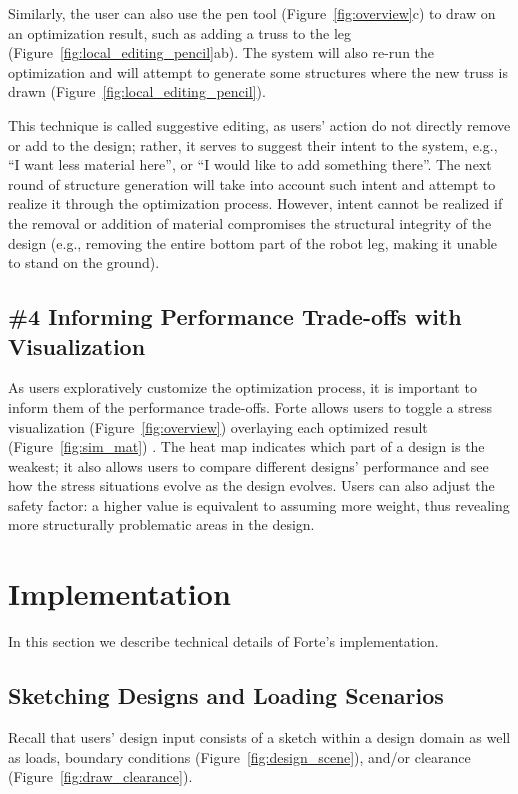 Similarly, the user can also use the pen tool (Figure~\ref{fig:overview}c) to draw on an optimization result, such as adding a truss to the leg (Figure~\ref{fig:local_editing_pencil}ab). The system will also re-run the optimization and will attempt to generate some structures where the new truss is drawn (Figure~\ref{fig:local_editing_pencil}).

This technique is called suggestive editing, as users' action do not directly remove or add to the design; rather, it serves to suggest their intent to the system, e.g., ``I want less material here'', or ``I would like to add something there''. The next round of structure generation will take into account such intent and attempt to realize it through the optimization process. However, intent cannot be realized if the removal or addition of material compromises the structural integrity of the design (e.g., removing the entire bottom part of the robot leg, making it unable to stand on the ground).

\subsection{\#4 Informing Performance Trade-offs with Visualization}
As users exploratively customize the optimization process, it is important to inform them of the performance trade-offs. Forte allows users to toggle a stress visualization (Figure~\ref{fig:overview}) overlaying each optimized result (Figure~\ref{fig:sim_mat}) . The heat map indicates which part of a design is the weakest; it also allows users to compare different designs' performance and see how the stress situations evolve as the design evolves. Users can also adjust the safety factor: a higher value is equivalent to assuming more weight, thus revealing more structurally problematic areas in the design.
 

\section{Implementation}
In this section we describe technical details of Forte's implementation. 

\subsection{Sketching Designs and Loading Scenarios}
Recall that users' design input consists of a sketch within a design domain as well as loads, boundary conditions (Figure~\ref{fig:design_scene}), and/or clearance (Figure~\ref{fig:draw_clearance}).

